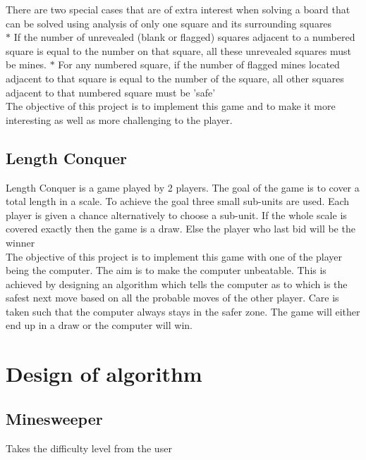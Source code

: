 \documentclass{article}
\begin{document}
There are two special cases that are of extra interest when solving a board that can be solved using analysis of only one square and its surrounding squares\\
    $*$ If the number of unrevealed (blank or flagged) squares adjacent to a numbered square is equal to the number on that square, all these unrevealed squares must be mines.
    $*$ For any numbered square, if the number of flagged mines located adjacent to that square is equal to the number of the square, all other squares adjacent to that numbered square must be 'safe'\\

The objective of this project is to implement this game and to make it more interesting as well as more challenging to the player.\\

\newpage
\subsection{Length Conquer }
Length Conquer is a game played by 2 players. The goal of the game is to cover a total length in a scale. To achieve the goal three small sub-units are used. Each player is given a chance alternatively to choose a sub-unit. If the whole scale is covered exactly then the game is a draw. Else the player who last bid will be the winner\\

The objective of this project is to implement this game with one of the player being the computer. The aim is to make the computer unbeatable. This is achieved by designing an algorithm which tells the computer as to which is the safest next move based on all the probable moves of the other player. Care is taken such that the computer always stays in the safer zone. The game will either end up in a draw or the computer will win. \\



\newpage 
\section{Design of algorithm}
\subsection{Minesweeper}
\begin{algorithm}
 \dontprintsemicolon
{}
  \caption {Takes the difficulty level from the user }
 \end{algorithm}
 
\end{document}
